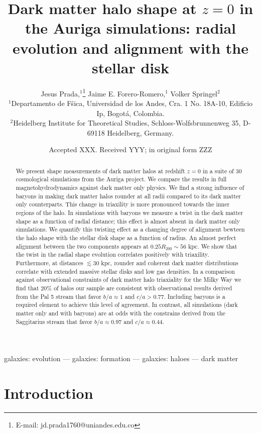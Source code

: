 \documentclass[a4paper,fleqn,usenatbib]{mnras}
\title[The shape of dark matter haloes at $z=0$ in Auriga]
{Dark matter halo shape at $z=0$ in the Auriga simulations: radial
  evolution and alignment with the stellar disk}
\author[Jesus Prada,  Jaime E. Forero-Romero, Volker Springel ]{
Jesus Prada,$^{1}$\thanks{E-mail: jd.prada1760@uniandes.edu.co}
Jaime E. Forero-Romero,$^{1}$
Volker Springel$^{2}$
\\
$^{1}$Departamento de F\'sica, Universidad de los Andes, Cra. 1 No.
18A-10, Edificio Ip, Bogot\'a, Colombia.\\
$^{2}$Heidelberg Institute for Theoretical Studies,
Schloss-Wolfsbrunnenweg 35, D-69118 Heidelberg, Germany.\\
}
\date{Accepted XXX. Received YYY; in original form ZZZ}
\begin{document}
\label{firstpage}
\pagerange{\pageref{firstpage}--\pageref{lastpage}}
\maketitle

\begin{abstract}
We present shape measurements of dark matter halos at redshift $z=0$
in a suite of 30 cosmological simulations from the Auriga project. 
We compare the results in full magnetohydrodynamics against dark
matter only physics. 
We find a strong influence of baryons in making dark matter halos
rounder at all radii compared to its dark matter only counterparts.
This change in triaxility is more pronounced towards the inner
regions of the halo.
In simulations with baryons we measure a twist in the dark matter
shape as a function of radial distance; this effect is almost absent
in dark matter only simulations.
We quantify this twisting effect as a changing degree of alignment
bewteen the halo shape with the stellar disk shape as a function of radius.
An almost perfect alignment between the two components appears at
$0.25R_{200}\sim56$ kpc.  
We show that the twist in the radial shape evolution correlates
positively with triaxility.
Furthermore, at distances $\lesssim 30$ kpc, rounder and coherent dark
matter distributions correlate with extended massive stellar disks and
low gas densities. 
In a comparison against observational constraints of dark matter halo
triaxiality for the Milky Way we find that $20\%$ of halos our sample
are consistent with observational results derived from the Pal 5 stream
that favor $b/a\approx 1$ and $c/a>0.77$. Including baryons is a
required element to achieve this level of agreement.
In contrast, all simulations (dark matter only and with baryons) are at
odds with the constrains derived from the Saggitarius stream that
favor $b/a\approx 0.97$ and $c/a\approx0.44$.
\end{abstract}

\begin{keywords}
galaxies: evolution --- galaxies: formation --- galaxies: haloes ---
dark matter
\end{keywords}



\section{Introduction}
\end{document}

